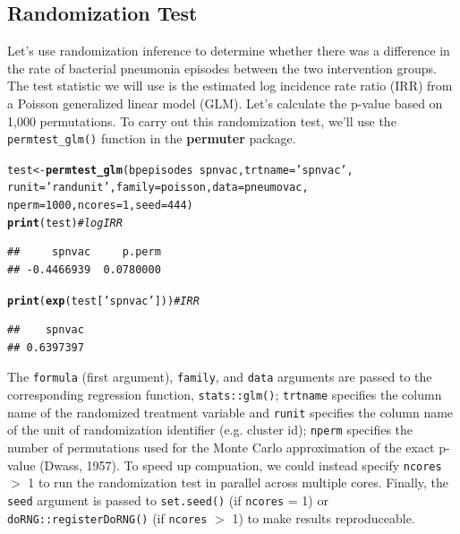 \documentclass[12pt]{article}\usepackage[]{graphicx}\usepackage[]{color}
\makeatletter
\newcommand{\hlnum}[1]{\textcolor[rgb]{0.686,0.059,0.569}{#1}}%
\newcommand{\hlstr}[1]{\textcolor[rgb]{0.192,0.494,0.8}{#1}}%
\newcommand{\hlcom}[1]{\textcolor[rgb]{0.678,0.584,0.686}{\textit{#1}}}%
\newcommand{\hlopt}[1]{\textcolor[rgb]{0,0,0}{#1}}%
\newcommand{\hlstd}[1]{\textcolor[rgb]{0.345,0.345,0.345}{#1}}%
\newcommand{\hlkwb}[1]{\textcolor[rgb]{0.69,0.353,0.396}{#1}}%
\newcommand{\hlkwc}[1]{\textcolor[rgb]{0.333,0.667,0.333}{#1}}%
\newcommand{\hlkwd}[1]{\textcolor[rgb]{0.737,0.353,0.396}{\textbf{#1}}}%
\newenvironment{kframe}{%
 \def\at@end@of@kframe{}%
 \ifinner\ifhmode%
  \def\at@end@of@kframe{\end{minipage}}%
  \begin{minipage}{\columnwidth}%
 \fi\fi%
 \def\FrameCommand##1{\hskip\@totalleftmargin \hskip-\fboxsep
 \colorbox{shadecolor}{##1}\hskip-\fboxsep
     \hskip-\linewidth \hskip-\@totalleftmargin \hskip\columnwidth}%
 \MakeFramed {\advance\hsize-\width
   \@totalleftmargin\z@ \linewidth\hsize
   \@setminipage}}%
 {\par\unskip\endMakeFramed%
 \at@end@of@kframe}
\newenvironment{knitrout}{}{} %
\makeatother
\begin{document}
\subsection{Randomization Test}
Let's use randomization inference to determine whether there was a difference in the rate of bacterial pneumonia episodes between the two intervention groups. The test statistic we will use is the estimated log incidence rate ratio (IRR) from a Poisson generalized linear model (GLM). Let's calculate the p-value based on 1,000 permutations. To carry out this randomization test, we'll use the \texttt{permtest\_glm()} function in the \textbf{permuter} package.
\begin{knitrout}
\color{fgcolor}\begin{kframe}
\begin{alltt}
\hlstd{test} \hlkwb{<-} \hlkwd{permtest_glm}\hlstd{(bpepisodes} \hlopt{~} \hlstd{spnvac,} \hlkwc{trtname} \hlstd{=} \hlstr{'spnvac'}\hlstd{,}
                     \hlkwc{runit} \hlstd{=} \hlstr{'randunit'}\hlstd{,} \hlkwc{family} \hlstd{= poisson,} \hlkwc{data} \hlstd{= pneumovac,}
                     \hlkwc{nperm} \hlstd{=} \hlnum{1000}\hlstd{,} \hlkwc{ncores} \hlstd{=} \hlnum{1}\hlstd{,} \hlkwc{seed} \hlstd{=} \hlnum{444}\hlstd{)}
\hlkwd{print}\hlstd{(test)} \hlcom{# logIRR}
\end{alltt}
\begin{verbatim}
##     spnvac     p.perm 
## -0.4466939  0.0780000
\end{verbatim}
\begin{alltt}
\hlkwd{print}\hlstd{(}\hlkwd{exp}\hlstd{(test[}\hlstr{'spnvac'}\hlstd{]))} \hlcom{# IRR}
\end{alltt}
\begin{verbatim}
##    spnvac 
## 0.6397397
\end{verbatim}
\end{kframe}
\end{knitrout}
The \texttt{formula} (first argument), \texttt{family}, and \texttt{data} arguments are passed to the corresponding regression function, \texttt{stats::glm()}; \texttt{trtname} specifies the column name of the randomized treatment variable and \texttt{runit} specifies the column name of the unit of randomization identifier (e.g. cluster id); \texttt{nperm} specifies the number of permutations used for the Monte Carlo approximation of the exact p-value (Dwass, 1957). To speed up compuation, we could instead specify \texttt{ncores} $>$ 1 to run the randomization test in parallel across multiple cores. Finally, the \texttt{seed} argument is passed to \texttt{set.seed()} (if \texttt{ncores} = 1) or \texttt{doRNG::registerDoRNG()} (if \texttt{ncores} $>$ 1) to make results reproduceable.
\end{document}
